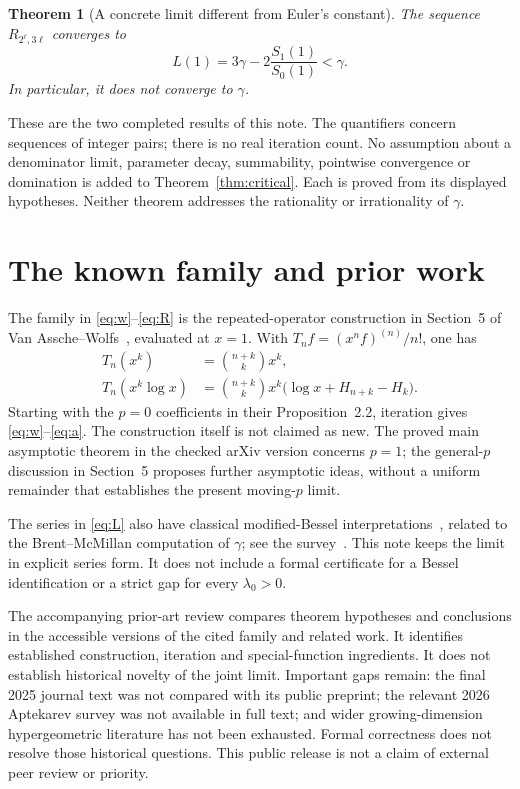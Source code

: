 \documentclass[11pt]{article}
\newtheorem{theorem}{Theorem}
\begin{document}
\begin{theorem}[A concrete limit different from Euler's constant]\label{thm:concrete}
The sequence $R_{2^\ell,3\ell}$ converges to
\[
L(1)=3\gamma-2\frac{S_1(1)}{S_0(1)}<\gamma.
\]
In particular, it does not converge to $\gamma$.
\end{theorem}

These are the two completed results of this note. The quantifiers concern sequences of integer pairs; there is no real iteration count. No assumption about a denominator limit, parameter decay, summability, pointwise convergence or domination is added to Theorem~\ref{thm:critical}. Each is proved from its displayed hypotheses. Neither theorem addresses the rationality or irrationality of $\gamma$.

\section{The known family and prior work}
The family in \eqref{eq:w}--\eqref{eq:R} is the repeated-operator construction in Section~5 of Van Assche--Wolfs~\cite{vw}, evaluated at $x=1$. With $T_nf=(x^nf)^{(n)}/n!$, one has
\begin{align*}
T_n(x^k)&=\binom{n+k}{k}x^k,\\
T_n(x^k\log x)&=\binom{n+k}{k}x^k\bigl(\log x+H_{n+k}-H_k\bigr).
\end{align*}
Starting with the $p=0$ coefficients in their Proposition~2.2, iteration gives \eqref{eq:w}--\eqref{eq:a}. The construction itself is not claimed as new. The proved main asymptotic theorem in the checked arXiv version concerns $p=1$; the general-$p$ discussion in Section~5 proposes further asymptotic ideas, without a uniform remainder that establishes the present moving-$p$ limit.

The series in \eqref{eq:L} also have classical modified-Bessel interpretations~\cite{dlmfseries}, related to the Brent--McMillan computation of $\gamma$; see the survey~\cite{lagarias}. This note keeps the limit in explicit series form. It does not include a formal certificate for a Bessel identification or a strict gap for every $\lambda_0>0$.

The accompanying prior-art review compares theorem hypotheses and conclusions in the accessible versions of the cited family and related work. It identifies established construction, iteration and special-function ingredients. It does not establish historical novelty of the joint limit. Important gaps remain: the final 2025 journal text was not compared with its public preprint; the relevant 2026 Aptekarev survey was not available in full text; and wider growing-dimension hypergeometric literature has not been exhausted. Formal correctness does not resolve those historical questions. This public release is not a claim of external peer review or priority.
\end{document}
